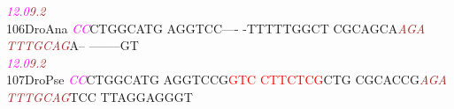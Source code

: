 \documentclass[11pt,twoside,reqno,a4paper]{article}
\begin{document}
{\hspace*{4\charwidth}\hspace*{7\charwidth}\hspace*{0\charwidth}\textit{\textcolor{magenta}{12.0}}\hspace*{1\charwidth}\hspace*{1\charwidth}\hspace*{1\charwidth}\hspace*{33\charwidth}\textit{\textcolor{brown}{9.2}}\hspace*{1\charwidth}\hspace*{1\charwidth}\hspace*{1\charwidth}\\
106\hspace*{1\charwidth}DroAna	\textit{\textcolor{magenta}{C}}\textit{\textcolor{magenta}{C}}CTGGCATG	AGGTCC----	-TTTTTGGCT	CGCAGCA\textit{\textcolor{brown}{A}}\textit{\textcolor{brown}{G}}\textit{\textcolor{brown}{A}}	\textit{\textcolor{brown}{T}}\textit{\textcolor{brown}{T}}\textit{\textcolor{brown}{T}}\textit{\textcolor{brown}{G}}\textit{\textcolor{brown}{C}}\textit{\textcolor{brown}{A}}\textit{\textcolor{brown}{G}}A--	--------GT	\\
\hspace*{4\charwidth}\hspace*{7\charwidth}\hspace*{0\charwidth}\textit{\textcolor{magenta}{12.0}}\hspace*{1\charwidth}\hspace*{1\charwidth}\hspace*{1\charwidth}\hspace*{33\charwidth}\textit{\textcolor{brown}{9.2}}\hspace*{1\charwidth}\hspace*{1\charwidth}\hspace*{1\charwidth}\\
107\hspace*{1\charwidth}DroPse	\textit{\textcolor{magenta}{C}}\textit{\textcolor{magenta}{C}}CTGGCATG	AGGTCCG\textcolor{red}{G}\textcolor{red}{T}\textcolor{red}{C}	\textcolor{red}{C}\textcolor{red}{T}\textcolor{red}{T}\textcolor{red}{C}\textcolor{red}{T}\textcolor{red}{C}\textcolor{red}{G}CTG	CGCACCG\textit{\textcolor{brown}{A}}\textit{\textcolor{brown}{G}}\textit{\textcolor{brown}{A}}	\textit{\textcolor{brown}{T}}\textit{\textcolor{brown}{T}}\textit{\textcolor{brown}{T}}\textit{\textcolor{brown}{G}}\textit{\textcolor{brown}{C}}\textit{\textcolor{brown}{A}}\textit{\textcolor{brown}{G}}TCC	TTAGGAGGGT	\\
}
\end{document}
